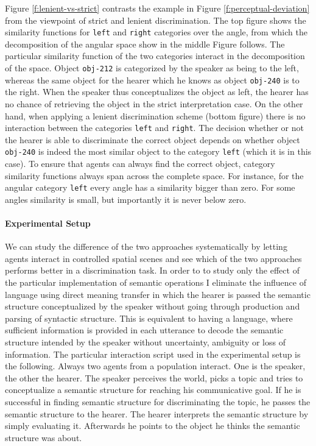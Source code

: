 Figure \ref {f:lenient-vs-strict} contrasts the example in Figure \ref{f:perceptual-deviation} 
from the viewpoint of strict and lenient discrimination. The top figure shows 
the similarity functions for {\footnotesize\tt left} and {\footnotesize\tt right} categories over the angle, 
from which the decomposition of the angular space show in the middle Figure follows.
The particular similarity function of the two categories interact in the decomposition
of the space. Object {\footnotesize\tt obj-212} is categorized by the speaker as being to the
left, whereas the same object for the hearer which he knows as object {\footnotesize\tt obj-240} is 
to the right. When the speaker thus conceptualizes the object as left, the hearer has no 
chance of retrieving the object in the strict interpretation case. On the other hand, when
applying a lenient discrimination scheme (bottom figure) there is no interaction 
between the categories {\footnotesize\tt left} and {\footnotesize\tt right}.
The decision whether or not the hearer is able to discriminate the correct object
depends on whether object {\footnotesize\tt obj-240} is indeed the most similar object
to the category {\footnotesize\tt left} (which it is in this case). To ensure that agents
can always find the correct object, category similarity functions always
span across the complete space. For instance, for the angular category
{\footnotesize\tt left} every angle has a similarity bigger than zero. For some angles
similarity is small, but importantly it is never below zero.

\paragraph*{Experimental Setup}
We can study the difference of the two approaches systematically by letting agents
interact in controlled spatial scenes and see
which of the two approaches performs better in a discrimination task. 
In order to to study only the effect of the particular implementation of semantic 
operations I eliminate the influence of language using 
direct meaning transfer in which the hearer is passed the
semantic structure conceptualized by the speaker without going
through production and parsing of syntactic structure. 
This is equivalent to having 
a language, where sufficient information is provided in each utterance
to decode the semantic structure intended by the speaker 
without uncertainty, ambiguity or loss of information.
The particular interaction script used in the experimental
setup is the following. Always two agents from a population interact. 
One is the speaker, the other the hearer. The speaker perceives the world,
picks a topic and tries to conceptualize a semantic structure
for reaching his communicative goal. If he is successful in finding
semantic structure for discriminating the topic, he passes the semantic
structure to the hearer. The hearer interprets the semantic structure
by simply evaluating it. Afterwards he points to the object he
thinks the semantic structure was about. 

